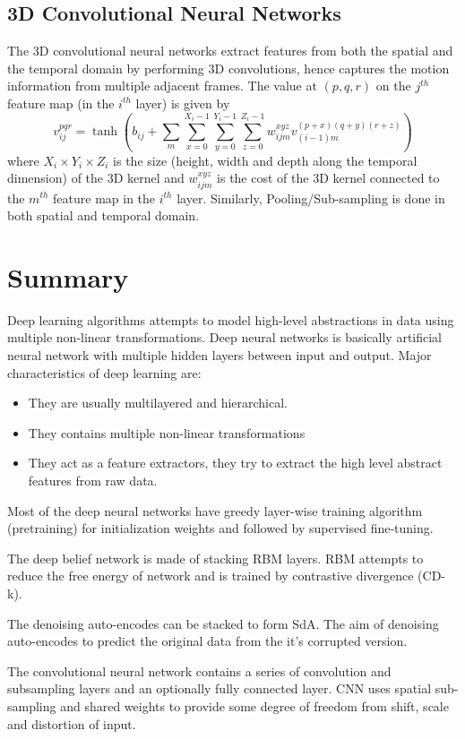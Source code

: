 \subsection{3D Convolutional Neural Networks}
The 3D convolutional neural networks extract features from both the spatial and the temporal domain by performing 3D convolutions, hence captures the motion information from multiple adjacent frames.\cite{ji20133d} The value at $(p, q, r)$ on the $j^{th}$ feature map (in the $i^{th}$ layer) is given by
$$v^{pqr}_{ij} = \tanh(b_{ij}+\sum_{m} \sum_{x=0}^{X_i-1} \sum_{y=0}^{Y_i-1} \sum_{z=0}^{Z_i-1} w^{xyz}_{ijm} v^{(p+x)(q+y)(r+z)}_{(i−1)m}) $$
where $X_i \times Y_i \times Z_i$ is the size (height, width and depth  along the temporal dimension) of the 3D kernel and $w^{xyz}_{ijm}$ is the cost of the 3D kernel connected to the $m^{th}$ feature map in the $i^{th}$ layer. Similarly, Pooling/Sub-sampling is done in both spatial and temporal domain.

\section{Summary}
Deep learning algorithms attempts to model high-level abstractions in data using multiple non-linear transformations. Deep neural networks is basically artificial neural network with multiple hidden layers between input and output. Major characteristics of deep learning are:
\begin{itemize}
\item They are usually multilayered and hierarchical.
\item They contains multiple non-linear transformations 
\item They act as a feature extractors, they try to extract the high level abstract features from raw data.
\end{itemize}

Most of the deep neural networks have greedy layer-wise training algorithm (pretraining) for initialization weights and followed by supervised fine-tuning.
 
The deep belief network is made of stacking RBM layers. RBM attempts to reduce the free energy of network and is trained by contrastive divergence (CD-k).

The denoising auto-encodes can be stacked to form SdA. The aim of denoising auto-encodes to predict the original data from the it's corrupted version.

The convolutional neural network contains a series of convolution and subsampling layers and an optionally fully connected layer. CNN uses spatial sub-sampling and shared weights to provide some degree of freedom from shift, scale and distortion of input.
